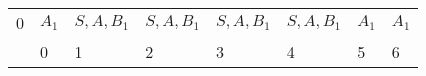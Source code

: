 \documentclass[12pt]{article}
\begin{document}
\begin{enumerate}
\begin{table}[h]
\begin{tabular}{llllllll}
\multicolumn{1}{l|}{\cellcolor[HTML]{DAE8FC}0} & \multicolumn{1}{l|}{$A_1$} & \multicolumn{1}{l|}{$S,A,B_1$}                & \multicolumn{1}{l|}{$S,A,B_1$}                & \multicolumn{1}{l|}{$S,A,B_1$}                & \multicolumn{1}{l|}{$S,A,B_1$}                & \multicolumn{1}{l|}{$A_1$}                    & \multicolumn{1}{l|}{$A_1$}                    \\ \cline{2-8} 
                                               & \cellcolor[HTML]{CBCEFB}0  & \cellcolor[HTML]{CBCEFB}1                     & \cellcolor[HTML]{CBCEFB}2                     & \cellcolor[HTML]{CBCEFB}3                     & \cellcolor[HTML]{CBCEFB}4                     & \cellcolor[HTML]{CBCEFB}5                     & \cellcolor[HTML]{CBCEFB}6                    
\end{tabular}
\end{table}



\end{enumerate}
\end{document}
